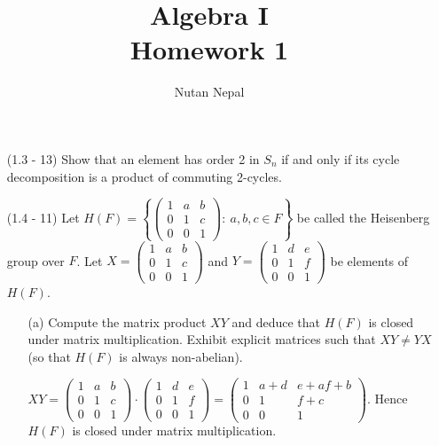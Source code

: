\documentclass[12pt]{article}
\title{\textbf{Algebra I}\\
\large Homework 1
}
\author{Nutan Nepal}
\begin{document}
\maketitle
\makebox[\linewidth]{\rule{200mm}{1pt}}
\vspace{.1in}
\begin{enumerate}

\item[(1.3 - 13)] Show that an element has order 2 in 
    $S_n$ if and only if its cycle decomposition is a
    product of commuting 2-cycles.

\begin{mybox}

\end{mybox}


\item[(1.4 - 11)] Let $H(F)=\left\{\left(\begin{array}{ccc}
    1 & a & b\\
    0 & 1 & c\\
    0 & 0 & 1 \end{array}
    \right):\ a,b,c\in F\right\}$ be called the Heisenberg
    group over $F$. Let $X=\left(\begin{array}{ccc}
        1 & a & b\\
        0 & 1 & c\\
        0 & 0 & 1 \end{array}
        \right)$
    and $Y=\left(\begin{array}{ccc}
        1 & d & e\\
        0 & 1 & f\\
        0 & 0 & 1 \end{array}
        \right)$ be elements of $H(F)$.
    \begin{enumerate}

        \item[(a)] Compute the matrix product $XY$ and
        deduce that $H(F)$ is closed under matrix
        multiplication. Exhibit explicit matrices such that
        $XY\neq YX$ (so that $H(F)$ is always non-abelian).
        \begin{mybox}
            
            $XY=\left(\begin{array}{ccc}
                1 & a & b\\
                0 & 1 & c\\
                0 & 0 & 1 \end{array}
                \right)\cdot
                \left(\begin{array}{ccc}
                    1 & d & e\\
                    0 & 1 & f\\
                    0 & 0 & 1 \end{array}
                \right)
                =\left(\begin{array}{ccc}
                    1 & a+d & e+af+b\\
                    0 & 1 & f+c\\
                    0 & 0 & 1 \end{array}
                \right)$. Hence $H(F)$ is closed
                under matrix multiplication.


\end{mybox}
\end{enumerate}
\end{enumerate}
\end{document}
